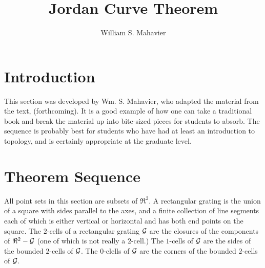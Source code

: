 \documentclass{article}
\let\titlepageAuthor\author
\renewcommand{\author}[1]{\newcommand{\headerAuthor}{#1}\titlepageAuthor{#1}}
\let\titlepageTitle\title
\renewcommand{\title}[1]{\newcommand{\headerTitle}{#1}\titlepageTitle{#1}}
\begin{document}
\title{Jordan Curve Theorem}
\author{William S. Mahavier}
\date{ }
\maketitle
\thispagestyle{empty}



\newpage


\section*{Introduction}

This section was developed by Wm. S. Mahavier, who adapted the material from the text, (forthcoming). It is a good example of how one can take a traditional book and break the material up into bite-sized pieces for students to absorb. The sequence is probably best for students who have had at least an introduction to topology, and is certainly appropriate at the graduate level.

\section*{Theorem Sequence}

All point sets in this section are subsets of $\Re^2$. A rectangular grating is the union of a square with sides parallel to the axes, and a finite collection of line segments each of which is either vertical or horizontal and has both end points on the square. The $2$-cells of a rectangular grating ${\cal G}$ are the closures of the components of $\Re^2 - {\cal G}$ (one of which is not really a $2$-cell.) The $1$-cells of ${\cal G}$ are the sides of the bounded $2$-cells of ${\cal G}$. The $0$-clells of ${\cal G}$ are the corners of the bounded $2$-cells of ${\cal G}$.
\end{document}
